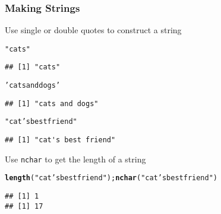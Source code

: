 \documentclass[paper=screen,mathserif]{beamer}\usepackage[]{graphicx}\usepackage[]{color}
\makeatletter
\newcommand{\hlstr}[1]{\textcolor[rgb]{0.192,0.494,0.8}{#1}}%
\newcommand{\hlstd}[1]{\textcolor[rgb]{0.345,0.345,0.345}{#1}}%
\newcommand{\hlkwd}[1]{\textcolor[rgb]{0.737,0.353,0.396}{\textbf{#1}}}%
\newenvironment{kframe}{%
 \def\at@end@of@kframe{}%
 \ifinner\ifhmode%
  \def\at@end@of@kframe{\end{minipage}}%
  \begin{minipage}{\columnwidth}%
 \fi\fi%
 \def\FrameCommand##1{\hskip\@totalleftmargin \hskip-\fboxsep
 \colorbox{shadecolor}{##1}\hskip-\fboxsep
     \hskip-\linewidth \hskip-\@totalleftmargin \hskip\columnwidth}%
 \MakeFramed {\advance\hsize-\width
   \@totalleftmargin\z@ \linewidth\hsize
   \@setminipage}}%
 {\par\unskip\endMakeFramed%
 \at@end@of@kframe}
\newenvironment{knitrout}{}{} %
\newcommand{\ft}[1]{\frametitle{#1}}
\newenvironment{xframe}[1][]
{\begin{frame}[fragile,environment=xframe]
    \frametitle{#1}}
  {\end{frame}}
\makeatother
\begin{document}
\begin{xframe}
  \ft{Making Strings}
  
  Use single or double quotes to construct a string
\begin{knitrout}\scriptsize
{}\color{fgcolor}\begin{kframe}
\begin{alltt}
\hlstr{"cats"}
\end{alltt}
\begin{verbatim}
## [1] "cats"
\end{verbatim}
\begin{alltt}
\hlstr{'cats and dogs'}
\end{alltt}
\begin{verbatim}
## [1] "cats and dogs"
\end{verbatim}
\begin{alltt}
\hlstr{"cat's best friend"}
\end{alltt}
\begin{verbatim}
## [1] "cat's best friend"
\end{verbatim}
\end{kframe}
\end{knitrout}
Use {\tt nchar} to get the length of a string
\begin{knitrout}\scriptsize
{}\color{fgcolor}\begin{kframe}
\begin{alltt}
\hlkwd{length}\hlstd{(}\hlstr{"cat's best friend"}\hlstd{);} \hlkwd{nchar}\hlstd{(}\hlstr{"cat's best friend"}\hlstd{)}
\end{alltt}
\begin{verbatim}
## [1] 1
## [1] 17
\end{verbatim}
\end{kframe}
\end{knitrout}
 
\end{xframe}
\end{document}
